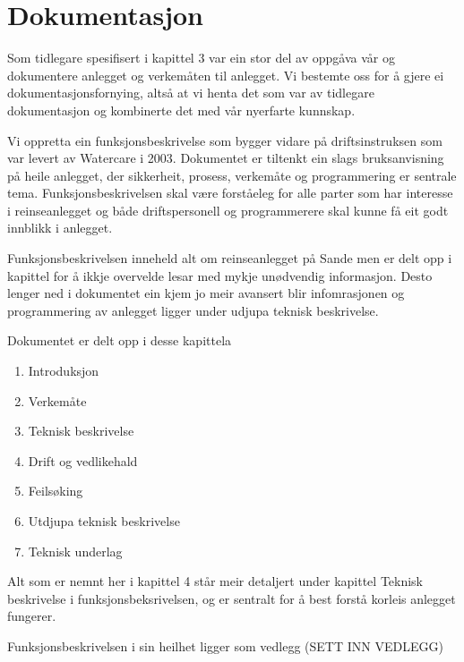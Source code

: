 \newpage
\section{Dokumentasjon}
\thispagestyle{fancy}

Som tidlegare spesifisert i kapittel 3 var ein stor del av oppgåva vår og dokumentere
anlegget og verkemåten til anlegget. Vi bestemte oss for å gjere ei dokumentasjonsfornying,
altså at vi henta det som var av tidlegare dokumentasjon og kombinerte det med vår nyerfarte kunnskap.

Vi oppretta ein funksjonsbeskrivelse som bygger vidare på driftsinstruksen som var levert av 
Watercare i 2003. Dokumentet er tiltenkt ein slags bruksanvisning på heile anlegget,
der sikkerheit, prosess, verkemåte og programmering er sentrale tema. \newline
Funksjonsbeskrivelsen skal være forståeleg for alle parter som har interesse i reinseanlegget
og både driftspersonell og programmerere skal kunne få eit godt innblikk i anlegget.

Funksjonsbeskrivelsen inneheld alt om reinseanlegget på Sande men er delt opp i kapittel for å ikkje
overvelde lesar med mykje unødvendig informasjon. Desto lenger ned i dokumentet ein kjem jo meir avansert blir infomrasjonen
og programmering av anlegget ligger under udjupa teknisk beskrivelse.

Dokumentet er delt opp i desse kapittela

\begin{enumerate}
    \item Introduksjon
    \item Verkemåte
    \item Teknisk beskrivelse
    \item Drift og vedlikehald
    \item Feilsøking
    \item Utdjupa teknisk beskrivelse
    \item Teknisk underlag
\end{enumerate}

Alt som er nemnt her i kapittel 4 står meir detaljert under kapittel Teknisk beskrivelse i funksjonsbeksrivelsen, og
er sentralt for å best forstå korleis anlegget fungerer.

Funksjonsbeskrivelsen i sin heilhet ligger som vedlegg (SETT INN VEDLEGG)